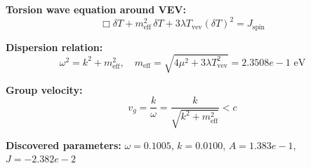 
\textbf{Torsion wave equation around VEV:}
\begin{equation}
  \Box \delta T + m_{\text{eff}}^2 \, \delta T + 3\lambda T_{\text{vev}} (\delta T)^2 = J_{\text{spin}}
\end{equation}

\textbf{Dispersion relation:}
\begin{equation}
  \omega^2 = k^2 + m_{\text{eff}}^2, \quad
  m_{\text{eff}} = \sqrt{4\mu^2 + 3\lambda T_{\text{vev}}^2} = 2.3508e-1 \text{ eV}
\end{equation}

\textbf{Group velocity:}
\begin{equation}
  v_g = \frac{k}{\omega} = \frac{k}{\sqrt{k^2 + m_{\text{eff}}^2}} < c
\end{equation}

\textbf{Discovered parameters:}
$\omega = 0.1005$, \quad
$k = 0.0100$, \quad
$A = 1.383e-1$, \quad
$J = -2.382e-2$